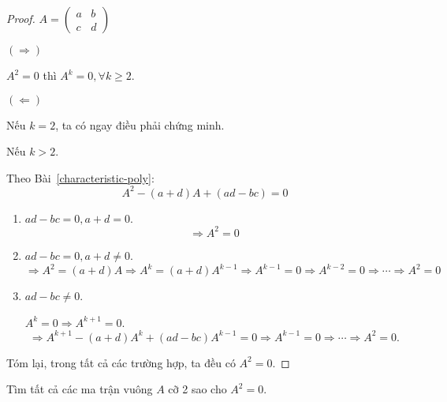 \documentclass[class=linearalgebra,crop=false]{standalone}
\begin{document}
\begin{proof}
    $A = \begin{pmatrix}a & b \\ c & d\end{pmatrix}$
    \par $(\Rightarrow)$
    \par $A^{2} = 0$ thì $A^{k} = 0,\forall k\ge 2$.
    \par $(\Leftarrow)$
    \par Nếu $k = 2$, ta có ngay điều phải chứng minh.
    \par Nếu $k > 2$.
    \par Theo Bài~\ref{characteristic-poly}:
    \[
        A^{2} - (a+d)A + (ad - bc) = 0
    \]
    \begin{enumerate}[label = Trường hợp \arabic*:,itemindent=2cm]
        \item $ad - bc = 0, a + d = 0$.
              \[
                  \Rightarrow A^{2} = 0
              \]
        \item $ad - bc = 0, a + d \ne 0$.
              \[
                  \Rightarrow A^{2} = (a+d)A \Rightarrow A^{k} = (a+d)A^{k-1} \Rightarrow A^{k-1} = 0\Rightarrow A^{k-2} = 0 \Rightarrow \cdots \Rightarrow A^{2} = 0
              \]
        \item $ad - bc \ne 0$.
              \par $A^{k} = 0\Rightarrow A^{k+1} = 0$.
              \[
                  \Rightarrow A^{k+1} - (a+d)A^{k} + (ad-bc)A^{k-1} = 0 \Rightarrow A^{k-1} = 0 \Rightarrow \cdots \Rightarrow A^{2} = 0.
              \]
    \end{enumerate}
    \par Tóm lại, trong tất cả các trường hợp, ta đều có $A^{2} = 0$.
\end{proof}

\begin{exercise}
    Tìm tất cả các ma trận vuông $A$ cỡ 2 sao cho $A^{2} = 0$.
\end{exercise}
\end{document}
